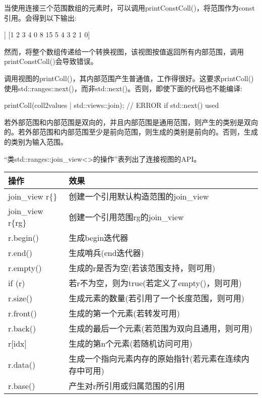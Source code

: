 当使用连接三个范围数组的元素时，可以调用printConstColl()，将范围作为const引用。会得到以下输出:

\begin{shell}
[[1 2 3 4] [0 8 15] [5 4 3 2 1 0]]
[1 2 3 4 0 8 15 5 4 3 2 1 0]
\end{shell}

然而，将整个数组传递给一个转换视图，该视图按值返回所有内部范围，调用printConstColl()会导致错误。

调用视图的printColl()，其内部范围产生普通值，工作得很好。这要求printColl()使用std::ranges::next()，而非std::next()。否则，即使下面的代码也不能编译:

\begin{cpp}
printColl(coll2values | std::views::join); // ERROR if std::next() used
\end{cpp}


若外部范围和内部范围是双向的，并且内部范围是通用范围，则产生的类别是双向的。若外部范围和内部范围至少是前向范围，则生成的类别是前向的。否则，生成的类别为输入范围。


“类std::ranges::join\_view<>的操作”表列出了连接视图的API。

\begin{longtable}[c]{|l|l|}
\hline
\textbf{操作} & \textbf{效果}                                                        \\ \hline
\endfirsthead
%
\endhead
%
join\_view r\{\}   & 创建一个引用默认构造范围的join\_view        \\ \hline
join\_view r\{rg\} & 创建一个引用范围rg的join\_view                           \\ \hline
r.begin()          & 生成begin迭代器                                              \\ \hline
r.end()            & 生成哨兵(end迭代器)                                      \\ \hline
r.empty()          & 生成的r是否为空(若该范围支持，则可用)          \\ \hline
if (r)             & 若r不为空，则为true(若定义了empty()，则可用)                \\ \hline
r.size()           & 生成元素的数量(若引用了一个长度范围，则可用) \\ \hline
r.front()          & 生成的第一个元素(若转发可用)                      \\ \hline
r.back()           & 生成的最后一个元素(若范围为双向且通用，则可用)         \\ \hline
r{[}idx{]}         & 生成的第n个元素(若随机访问可用)                    \\ \hline
r.data() & 生成一个指向元素内存的原始指针(若元素在连续内存中可用) \\ \hline
r.base()           & 产生对r所引用或归属范围的引用               \\ \hline
\end{longtable}

